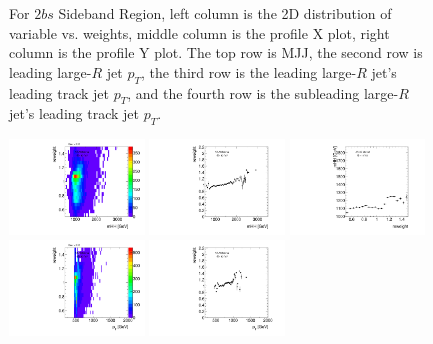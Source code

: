 \begin{figure}[htbp!]
\begin{center}
\caption{For $2bs$ Sideband Region, left column is the 2D distribution of variable vs. weights, middle column is the profile X plot, right column is the profile Y plot. The top row is MJJ, the second row is leading large-$R$ jet $p_{T}$, the third row is the leading large-$R$ jet's leading track jet $p_{T}$, and the fourth row is the subleading large-$R$ jet's leading track jet $p_{T}$.}
\label{fig:app-reweight-dist-2b-SB}
\end{center}
\end{figure}


\begin{figure}[htbp!]
\begin{center}
\includegraphics[width=0.32\textwidth,angle=-90]{figures/boosted/AppendixReweight/Weights/3Trk_Sideband_mHH_l_weight.pdf}
\includegraphics[width=0.32\textwidth,angle=-90]{figures/boosted/AppendixReweight/Weights/3Trk_Sideband_mHH_l_weight_profx.pdf}
\includegraphics[width=0.32\textwidth,angle=-90]{figures/boosted/AppendixReweight/Weights/3Trk_Sideband_mHH_l_weight_profy.pdf}\\
\includegraphics[width=0.32\textwidth,angle=-90]{figures/boosted/AppendixReweight/Weights/3Trk_Sideband_leadHCand_Pt_m_weight.pdf}
\includegraphics[width=0.32\textwidth,angle=-90]{figures/boosted/AppendixReweight/Weights/3Trk_Sideband_leadHCand_Pt_m_weight_profx.pdf}

\end{center}
\end{figure}
